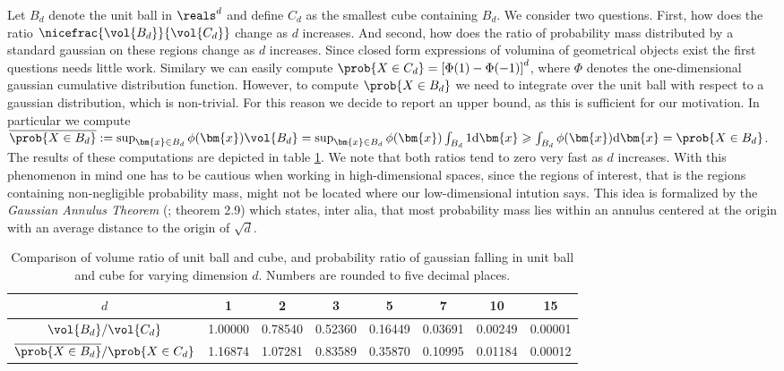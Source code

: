 Let $B_d$ denote the unit ball in $\reals^d$ and define $C_d$ as the smallest cube containing $B_d$.
We consider two questions.
First, how does the ratio $\nicefrac{\vol{B_d}}{\vol{C_d}}$ change as $d$ increases.
And second, how does the ratio of probability mass distributed by a standard gaussian on these regions change as $d$ increases.
Since closed form expressions of volumina of geometrical objects exist the first questions needs little work.
Similary we can easily compute $\prob{X \in C_d} = \left[\Phi(1) - \Phi(-1)\right]^d$, where $\Phi$ denotes the one-dimensional gaussian cumulative distribution function.
However, to compute $\prob{X \in B_d}$ we need to integrate over the unit ball with respect to a gaussian distribution, which is non-trivial.
For this reason we decide to report an upper bound, as this is sufficient for our motivation.
In particular we compute $\overline{\prob{X \in B_d}} := \sup_{\bm{x} \in B_d} \phi(\bm{x}) \vol{B_d} = \sup_{\bm{x} \in B_d} \phi(\bm{x}) \int_{B_d}1 \mathrm{d}\bm{x} \geqslant \int_{B_d} \phi(\bm{x}) \mathrm{d}\bm{x} = \prob{X \in B_d}$.
The results of these computations are depicted in table \ref{tab:vol_high_dim}.
We note that both ratios tend to zero very fast as $d$ increases.
With this phenomenon in mind one has to be cautious when working in high-dimensional spaces, since the regions of interest, that is the regions containing non-negligible probability mass, might not be located where our low-dimensional intution says.
This idea is formalized by the \emph{Gaussian Annulus Theorem} (\citet{blum2017foundations}; theorem 2.9) which states, inter alia, that most probability mass lies within an annulus centered at the origin with an average distance to the origin of $\sqrt{d}$.

\begin{table}[ht]
\def\arraystretch{1.3}
\centering
 \begin{tabular}{c | c c c c c c c}
 $d$ & 1 & 2 & 3 & 5 & 7 & 10 & 15\\
 \hline
 ${\vol{B_d}} / {\vol{C_d}}$ & 1.00000 & 0.78540 & 0.52360 & 0.16449 & 0.03691 & 0.00249 & 0.00001\\
 $\overline{\prob{X \in B_d}} / {\prob{X \in C_d}}$ & 1.16874 & 1.07281 & 0.83589 & 0.35870 & 0.10995 & 0.01184 & 0.00012
 \end{tabular}
 \caption{Comparison of volume ratio of unit ball and cube, and probability ratio of gaussian falling in unit ball and cube for varying dimension $d$. Numbers are rounded to five decimal places.}
\label{tab:vol_high_dim}
\end{table}

